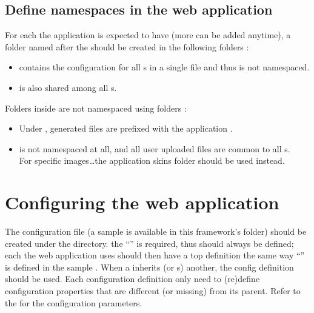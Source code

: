 \documentclass[pdftex,12pt,a4paper]{article}
\begin{document}
\subsection{Define namespaces in the web application}
For each  the application is expected to have (more can be added anytime), a folder named after the 
should be created in the following folders :
\begin{unbreakable}
\end{unbreakable}

\begin{itemize}
    \item {} contains the configuration for all s in a single file and thus is not namespaced.
    \item {} is also shared among all s.
\end{itemize}

Folders inside  are not namespaced using folders :
\begin{itemize}
    \item Under ,  generated files are prefixed with the application .
    \item {} is not namespaced at all, and all user uploaded files are common to all s. \\
    For  specific images\ldots the application skins folder should be used instead.
\end{itemize}


\section{Configuring the web application}

The configuration file (a sample is available in this framework's  folder)
 should be created under the   directory.
the  ``'' is required, thus should always be defined; each  the web application
uses should then have a top definition the same way ``'' is defined in the sample .
When a  inherits (or s) another, the  config definition should be used.
Each  configuration definition only need to (re)define configuration properties that are different (or missing) from its parent.
Refer to the  for the configuration parameters.
\end{document}
